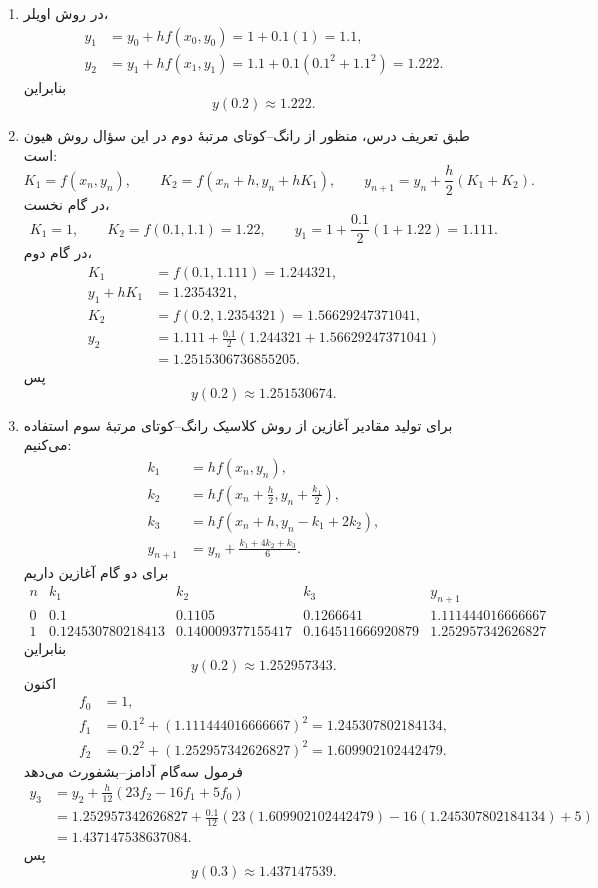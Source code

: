 \begin{enumerate}
\item
در روش اویلر،
\begin{align*}
 y_1&=y_0+h f(x_0,y_0)=1+0.1(1)=1.1,\\
 y_2&=y_1+h f(x_1,y_1)
     =1.1+0.1\left(0.1^2+1.1^2\right)=1.222.
\end{align*}
بنابراین
\[
 \boxed{y(0.2)\approx1.222}.
\]

\item
طبق تعریف درس، منظور از رانگ--کوتای مرتبهٔ دوم در این سؤال روش هیون است:
\[
 K_1=f(x_n,y_n),\qquad
 K_2=f(x_n+h,y_n+hK_1),\qquad
 y_{n+1}=y_n+\frac{h}{2}(K_1+K_2).
\]
در گام نخست،
\[
 K_1=1,\qquad K_2=f(0.1,1.1)=1.22,
 \qquad y_1=1+\frac{0.1}{2}(1+1.22)=1.111.
\]
در گام دوم،
\begin{align*}
 K_1&=f(0.1,1.111)=1.244321,\\
 y_1+hK_1&=1.2354321,\\
 K_2&=f(0.2,1.2354321)=1.56629247371041,\\
 y_2&=1.111+\frac{0.1}{2}
       \left(1.244321+1.56629247371041\right)\\
    &=1.2515306736855205.
\end{align*}
پس
\[
 \boxed{y(0.2)\approx1.251530674}.
\]

\item
برای تولید مقادیر آغازین از روش کلاسیک رانگ--کوتای مرتبهٔ سوم استفاده می‌کنیم:
\begin{align*}
 k_1&=h f(x_n,y_n),\\
 k_2&=h f\left(x_n+\frac h2,y_n+\frac{k_1}{2}\right),\\
 k_3&=h f(x_n+h,y_n-k_1+2k_2),\\
 y_{n+1}&=y_n+\frac{k_1+4k_2+k_3}{6}.
\end{align*}
برای دو گام آغازین داریم
\[
\begin{array}{c|ccc|c}
 n&k_1&k_2&k_3&y_{n+1}\\ \hline
 0&0.1&0.1105&0.1266641&1.111444016666667\\
 1&0.124530780218413&0.140009377155417&0.164511666920879
   &1.252957342626827
\end{array}
\]
بنابراین
\[
 \boxed{y(0.2)\approx1.252957343}.
\]
اکنون
\begin{align*}
 f_0&=1,\\
 f_1&=0.1^2+(1.111444016666667)^2
      =1.245307802184134,\\
 f_2&=0.2^2+(1.252957342626827)^2
      =1.609902102442479.
\end{align*}
فرمول سه‌گام آدامز--بشفورث می‌دهد
\begin{align*}
 y_3
 &=y_2+\frac{h}{12}(23f_2-16f_1+5f_0)\\
 &=1.252957342626827+\frac{0.1}{12}
   \left(23(1.609902102442479)-16(1.245307802184134)+5\right)\\
 &=1.437147538637084.
\end{align*}
پس
\[
 \boxed{y(0.3)\approx1.437147539}.
\]
\end{enumerate}
\endgroup
